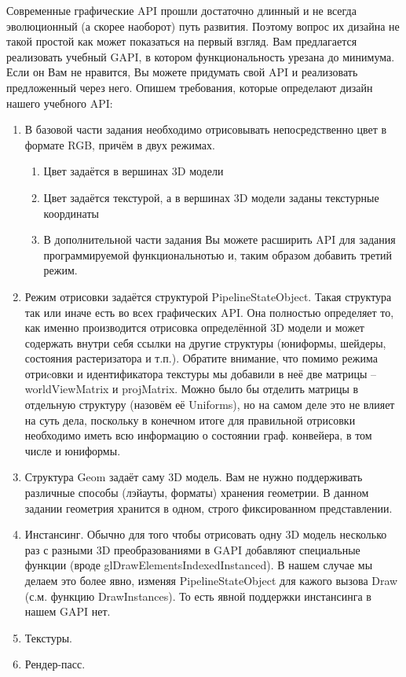 \documentclass[12pt,subf,href,colorlinks=true]{article}
\begin{document}
Современные графические API прошли достаточно длинный и не всегда эволюционный (а скорее наоборот) путь развития. Поэтому вопрос их дизайна не такой простой как может показаться на первый взгляд. Вам предлагается реализовать учебный GAPI, в котором функциональность урезана до минимума. Если он Вам не нравится, Вы можете придумать свой API и реализовать предложенный через него. Опишем требования, которые определают дизайн нашего учебного API:

\begin{enumerate}
\item В базовой части задания необходимо отрисовывать непосредственно цвет в формате RGB, причём в двух режимах.
\begin{enumerate}
\item Цвет задаётся в вершинах 3D модели
\item Цвет задаётся текстурой, а в вершинах 3D модели заданы текстурные координаты
\item В дополнительной части задания Вы можете расширить API для задания программируемой функциональнотью и, таким образом добавить третий режим.
\end{enumerate}

\item Режим отрисовки задаётся структурой PipelineStateObject. Такая структура так или иначе есть во всех графических API. Она полностью определяет то, как именно производится отрисовка определённой 3D модели и может содержать внутри себя ссылки на другие структуры (юниформы, шейдеры, состояния растеризатора и т.п.). Обратите внимание, что помимо режима отриcовки и идентификатора текстуры мы добавили в неё две матрицы -- worldViewMatrix и projMatrix. Можно было бы отделить матрицы в отдельную структуру (назовём её Uniforms), но на самом деле это не влияет на суть дела, поскольку в конечном итоге для правильной отрисовки необходимо иметь всю информацию о состоянии граф. конвейера, в том числе и юниформы.

\item Структура Geom задаёт саму 3D модель. Вам не нужно поддерживать различные способы (лэйауты, форматы) хранения геометрии. В данном задании геометрия хранится в одном, строго фиксированном представлении.

\item Инстансинг. Обычно для того чтобы отрисовать одну 3D модель несколько раз с разными 3D преобразованиями в GAPI добавляют специальные функции (вроде glDrawElementsIndexedInstanced). В нашем случае мы делаем это более явно, изменяя PipelineStateObject для кажого вызова Draw (с.м. функцию DrawInstances). То есть явной поддержки инстансинга в нашем GAPI нет.

\item Текстуры.

\item Рендер-пасс.


\end{enumerate}
\end{document}
